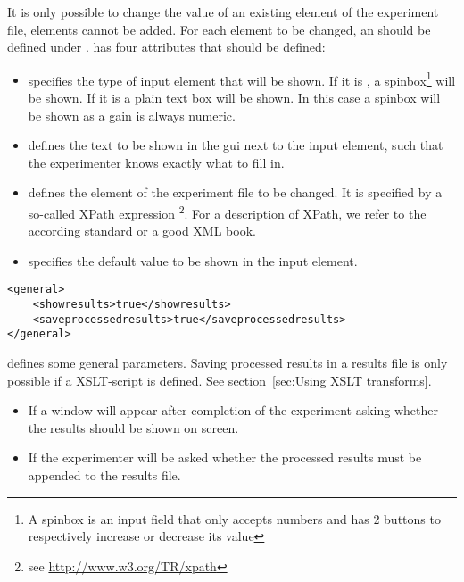 It is only possible to change the value of an existing element of the experiment file, elements cannot be added. For each element to be changed, an  should be defined under .  has  four attributes that should be defined:

\begin{itemize}
\item {} specifies the type of input element that
will be shown. If it is , a spinbox\footnote{A spinbox is
an input field that only accepts numbers and has 2 buttons to
respectively increase or decrease its value} will be shown. If it
is  a plain text box will be shown. In this case a
spinbox will be shown as a gain is always numeric. \item
{} defines the text to be shown in the
\ac{gui} next to the input element, such that the experimenter
knows exactly what to fill in. \item {}
defines the element of the experiment file to be changed. It is
specified by a so-called XPath expression \footnote{see
\url{http://www.w3.org/TR/xpath}}. For a description of XPath, we
refer to the according standard or a good XML book.

 \item {} specifies the
default value to be shown in the input element.
\end{itemize}

  

\begin{lstlisting}
<general>
    <showresults>true</showresults>
    <saveprocessedresults>true</saveprocessedresults>
</general>
\end{lstlisting}

 defines some general parameters. Saving
processed results in a results file is only possible if a
XSLT-script is defined. See section~\ref{sec:Using XSLT
transforms}.

\begin{itemize}
\item {} If  a window will appear
after completion of the experiment asking whether the results
should be shown on screen.

\item {} If  the
experimenter will be asked whether the processed results must be
appended to the results file.
\end{itemize}

  
